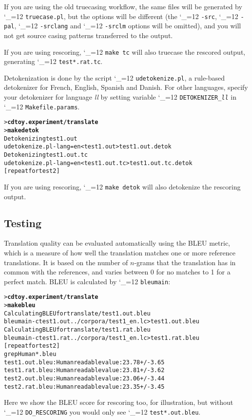 \documentclass[11pt,letterpaper]{article}
\def\code{\begingroup\catcode`\_=12 \codex}
\newcommand{\codex}[1]{\texttt{#1}\endgroup}
\begin{document}
If you are using the old truecasing workflow, the same files will be generated
by \code{truecase.pl}, but the options will be different (the \code{-src},
\code{-pal}, \code{-srclang} and \code{-srclm} options will be omitted), and you
will not get source casing patterns transferred to the output.

If you are using rescoring, \code{make tc} will also truecase the rescored
output, generating \code{test*.rat.tc}.

Detokenization is done by the script \code{udetokenize.pl}, a rule-based
detokenizer for French, English, Spanish and Danish.
For other languages, specify your detokenizer for language \emph{ll} by setting variable \code{DETOKENIZER_\emph{ll}} in \code{Makefile.params}.

\begin{small}
\begin{alltt}
   > \textbf{cd toy.experiment/translate}
   > \textbf{make detok}
   Detokenizing test1.out
   udetokenize.pl -lang=en < test1.out > test1.out.detok
   Detokenizing test1.out.tc
   udetokenize.pl -lang=en < test1.out.tc > test1.out.tc.detok
   [repeat for test2]
\end{alltt}
\end{small}

If you are using rescoring, \code{make detok} will also detokenize the
rescoring output.

\subsection{Testing} \label{Testing}

Translation quality can be evaluated automatically using the BLEU metric, which
is a measure of how well the translation matches one or more reference
translations. It is
based on the number of $n$-grams that the translation has in common
with the references, and varies between 0 for no matches to 1 for a perfect
match. BLEU is calculated by \code{bleumain}:
\begin{small}
\begin{alltt}
   > \textbf{cd toy.experiment/translate}
   > \textbf{make bleu}
   Calculating BLEU for translate/test1.out.bleu
   bleumain -c test1.out ../corpora/test1_en.lc > test1.out.bleu
   Calculating BLEU for translate/test1.rat.bleu
   bleumain -c test1.rat ../corpora/test1_en.lc > test1.rat.bleu
   [repeat for test2]
   grep Human *.bleu
   test1.out.bleu:Human readable value: 23.78 +/- 3.65
   test1.rat.bleu:Human readable value: 23.81 +/- 3.62
   test2.out.bleu:Human readable value: 23.06 +/- 3.44
   test2.rat.bleu:Human readable value: 23.35 +/- 3.45
\end{alltt}
\end{small}
Here we show the BLEU score for rescoring too, for illustration, but without
\code{DO_RESCORING} you would only see \code{test*.out.bleu}.
\end{document}
